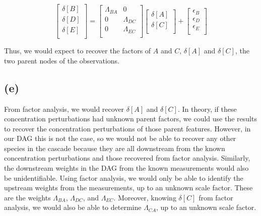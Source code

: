 \documentclass[12pt]{article}
\begin{document}
\[
    \begin{bmatrix}
                 \delta[B]  \\
                 \delta[D]  \\
                 \delta[E]  \\
         \end{bmatrix} = \begin{bmatrix}
                 \Lambda_{BA} & 0   \\
                 0 & \Lambda_{DC} \\
                 0 & \Lambda_{EC} \\
         \end{bmatrix} \begin{bmatrix}
                 \delta[A]  \\
                 \delta[C]  \\
         \end{bmatrix} +  \begin{bmatrix}
                 \epsilon_B  \\
                 \epsilon_D  \\
                 \epsilon_E  \\
         \end{bmatrix}
\]

Thus, we would expect to recover the factors of $A$ and $C$, $\delta[A]$ and $\delta[C]$, the two parent nodes of the observations.


\subsection*{(e)}

From factor analysis, we would recover $\delta[A]$ and $\delta[C]$.
In theory, if these concentration perturbations had unknown parent factors, we could use the results to recover the concentration perturbations of those parent features.
However, in our DAG this is not the case, so we would not be able to recover any other species in the cascade because  they are all downstream from the known concentration perturbations and those recovered from factor analysis.
Similarly, the downstream weights in the DAG from the known measurements would also be unidentifiable.
Using factor analysis, we would only be able to identify the upstream weights from the measurements, up to an unknown scale factor.
These are the weights $\Lambda_{BA}$, $\Lambda_{DC}$, and $\Lambda_{EC}$.
Moreover, knowing $\delta[C]$ from factor analysis, we would also be able to determine $\Lambda_{CA}$, up to an unknown scale factor.
\end{document}
